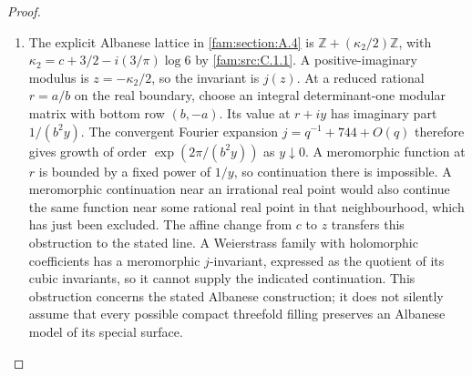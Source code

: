 \begin{proof}
\begin{enumerate}[label=\arabic*.,leftmargin=*]
\item The explicit Albanese lattice in \ref{fam:section:A.4} is
$\mathbb Z+(\kappa_2/2)\mathbb Z$, with
$\kappa_2=c+3/2-i(3/\pi)\log6$ by \ref{fam:src:C.1.1}. A positive-imaginary modulus is
$z=-\kappa_2/2$, so the invariant is $j(z)$. At a reduced rational
$r=a/b$ on the real boundary, choose an integral determinant-one modular
matrix with bottom row $(b,-a)$. Its value at $r+iy$ has imaginary part
$1/(b^2y)$. The convergent Fourier expansion $j=q^{-1}+744+O(q)$ therefore
gives growth of order $\exp(2\pi/(b^2y))$ as $y\downarrow0$.
A meromorphic function at $r$ is bounded by a fixed power of $1/y$,
so continuation there is impossible. A meromorphic continuation near an
irrational real point would also continue the same function near some
rational real point in that neighbourhood, which has just been excluded.
The affine change from $c$ to $z$ transfers this obstruction to the
stated line. A Weierstrass family with holomorphic coefficients has a
meromorphic $j$-invariant, expressed as the quotient of its cubic
invariants, so it cannot supply the indicated continuation. This
obstruction concerns the stated Albanese construction; it does not
silently assume that every possible compact threefold filling preserves
an Albanese model of its special surface.
\end{enumerate}
\end{proof}

